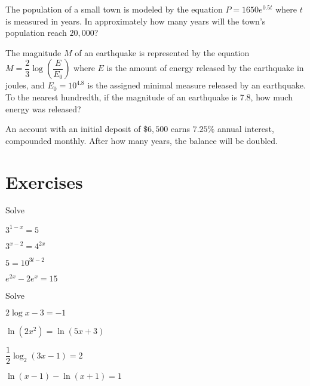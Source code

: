 \begin{example}
  The population of a small town is modeled by the equation $P=1650e^{0.5t}$ where $t$ is measured in years. In approximately how many years will the town's population reach $20,000$?
\end{example}

\newpage

\begin{example}
  The magnitude $M$ of an earthquake is represented by the equation $M=\dfrac{2}{3}\log\left( \dfrac{E}{E_0} \right)$ where $E$ is the amount of energy released by the earthquake in joules, and $E_0=10^{4.8}$ is the assigned minimal measure released by an earthquake. To the nearest hundredth, if the magnitude of an earthquake is 7.8, how much energy was released?
\end{example}

\begin{example}
  An account with an initial deposit of $\$6,500$ earns $7.25\%$ annual interest, compounded monthly. After how many years, the balance will be doubled.
\end{example}


\newpage

\section*{Exercises}

\begin{exercise}
  Solve\\ 
  \begin{enumerate*}
    \item $3^{1-x}=5$
    \item $3^{x-2}=4^{2x}$
    \item $5=10^{3t-2}$
    \item $e^{2x}-2e^x=15$
  \end{enumerate*}  
\end{exercise}

\begin{exercise}
  Solve\\
\begin{enumerate*}
  \item $2\log x-3=-1$
  \item $\ln(2x^2)=\ln(5x+3)$
  \item $\dfrac{1}{2}\log_2(3x-1)=2$
  \item $\ln(x-1)-\ln(x+1)=1$
\end{enumerate*}
\end{exercise}


